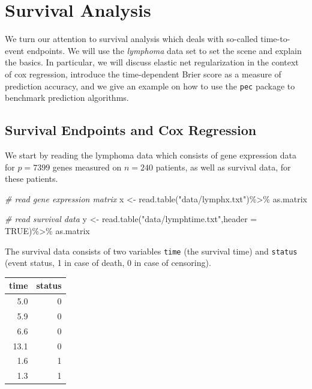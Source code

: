 \documentclass[
]{book}
\newenvironment{Shaded}{\begin{snugshade}}{\end{snugshade}}
\newcommand{\AttributeTok}[1]{\textcolor[rgb]{0.77,0.63,0.00}{#1}}
\newcommand{\CommentTok}[1]{\textcolor[rgb]{0.56,0.35,0.01}{\textit{#1}}}
\newcommand{\ConstantTok}[1]{\textcolor[rgb]{0.00,0.00,0.00}{#1}}
\newcommand{\FunctionTok}[1]{\textcolor[rgb]{0.00,0.00,0.00}{#1}}
\newcommand{\NormalTok}[1]{#1}
\newcommand{\OtherTok}[1]{\textcolor[rgb]{0.56,0.35,0.01}{#1}}
\newcommand{\SpecialCharTok}[1]{\textcolor[rgb]{0.00,0.00,0.00}{#1}}
\newcommand{\StringTok}[1]{\textcolor[rgb]{0.31,0.60,0.02}{#1}}
\begin{document}
\hypertarget{survival-analysis}{%
\chapter{Survival Analysis}\label{survival-analysis}}

We turn our attention to survival analysis which deals with so-called time-to-event endpoints. We will use the \emph{lymphoma} data set to set the scene and explain the basics. In particular, we will discuss elastic net regularization in the context of cox regression, introduce the time-dependent Brier score as a measure of prediction accuracy, and we give an example on how to use the \texttt{pec} package to benchmark prediction algorithms.

\hypertarget{survival-endpoints-and-cox-regression}{%
\section{Survival Endpoints and Cox Regression}\label{survival-endpoints-and-cox-regression}}

We start by reading the lymphoma data which consists of gene expression data for \(p=7399\) genes measured on \(n=240\) patients, as well as survival data, for these patients.

\begin{Shaded}
\begin{Highlighting}[]
\CommentTok{\# read gene expression matrix}
\NormalTok{x }\OtherTok{\textless{}{-}} \FunctionTok{read.table}\NormalTok{(}\StringTok{"data/lymphx.txt"}\NormalTok{)}\SpecialCharTok{\%\textgreater{}\%}
\NormalTok{  as.matrix}

\CommentTok{\# read survival data}
\NormalTok{y }\OtherTok{\textless{}{-}} \FunctionTok{read.table}\NormalTok{(}\StringTok{"data/lymphtime.txt"}\NormalTok{,}\AttributeTok{header =} \ConstantTok{TRUE}\NormalTok{)}\SpecialCharTok{\%\textgreater{}\%}
\NormalTok{  as.matrix}
\end{Highlighting}
\end{Shaded}

The survival data consists of two variables \texttt{time} (the survival time) and \texttt{status} (event status, 1 in case of death, 0 in case of censoring).

\begin{tabular}{r|r}
\hline
time & status\\
\hline
5.0 & 0\\
\hline
5.9 & 0\\
\hline
6.6 & 0\\
\hline
13.1 & 0\\
\hline
1.6 & 1\\
\hline
1.3 & 1\\
\hline
\end{tabular}
\end{document}
